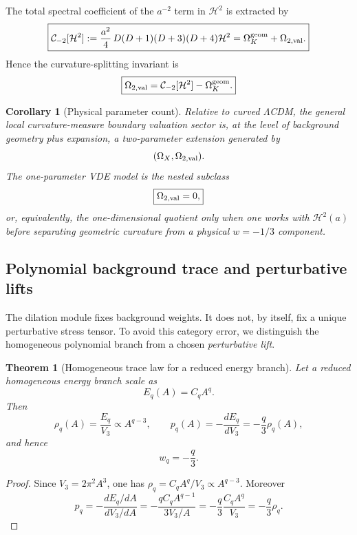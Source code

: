 \documentclass[11pt,a4paper]{article}
\def\dd{d}%
\def\Dil{D}%
\numberwithin{equation}{section}
\theoremstyle{definition}
\theoremstyle{plain}
\newtheorem{theorem}[criterion]{Theorem}
\newtheorem{corollary}[criterion]{Corollary}
\theoremstyle{remark}
\newcommand{\Dil}{\mathscr{D}}
\newcommand{\dd}{\mathrm{d}}
\begin{document}
The total spectral coefficient of the \(a^{-2}\) term in \(\mathcal H^2\) is extracted by
\begin{equation}
\boxed{
\mathcal C_{-2}[\mathcal H^2]
:=\frac{a^2}{4}\,
\Dil(\Dil+1)(\Dil+3)(\Dil+4)\mathcal H^2
=\Omega_K^{\rm geom}+\Omega_{2,\rm val}.
}
\end{equation}
Hence the curvature-splitting invariant is
\begin{equation}
\boxed{
\Omega_{2,\rm val}
=\mathcal C_{-2}[\mathcal H^2]-\Omega_K^{\rm geom}.
}
\end{equation}

\begin{corollary}[Physical parameter count]
Relative to curved \(\Lambda\)CDM, the general local curvature-measure boundary valuation sector is, at the level of background geometry plus expansion, a two-parameter extension generated by
\begin{equation}
(\Omega_X,\Omega_{2,\rm val}).
\end{equation}
The one-parameter VDE model is the nested subclass
\begin{equation}
\boxed{\Omega_{2,\rm val}=0,}
\end{equation}
or, equivalently, the one-dimensional quotient only when one works with \(\mathcal H^2(a)\) before separating geometric curvature from a physical \(w=-1/3\) component.
\end{corollary}



\subsection{Polynomial background trace and perturbative lifts}
\label{sec:polynomial-lifts}

The dilation module fixes background weights.  It does not, by itself, fix a unique perturbative stress tensor.  To avoid this category error, we distinguish the homogeneous polynomial branch from a chosen \emph{perturbative lift}.

\begin{theorem}[Homogeneous trace law for a reduced energy branch]
Let a reduced homogeneous energy branch scale as
\begin{equation}
E_q(A)=C_qA^q.
\end{equation}
Then
\begin{equation}
\rho_q(A)=\frac{E_q}{V_3}\propto A^{q-3},
\qquad
p_q(A)=-\frac{\dd E_q}{\dd V_3}=-\frac q3\rho_q(A),
\end{equation}
and hence
\begin{equation}
\boxed{w_q=-\frac q3.}
\end{equation}
\end{theorem}
\begin{proof}
Since \(V_3=2\pi^2A^3\), one has \(\rho_q=C_qA^q/V_3\propto A^{q-3}\).  Moreover
\begin{equation}
p_q=-\frac{\dd E_q/\dd A}{\dd V_3/\dd A}
=-\frac{qC_qA^{q-1}}{3V_3/A}
=-\frac q3\frac{C_qA^q}{V_3}
=-\frac q3\rho_q.
\end{equation}
\end{proof}
\end{document}
